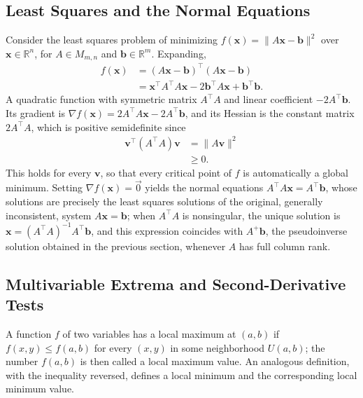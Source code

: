 \subsection{Least Squares and the Normal Equations}

\begin{example}
Consider the least squares problem of minimizing $f(\mathbf{x}) = \|A\mathbf{x} - \mathbf{b}\|^2$ over $\mathbf{x} \in \mathbb{R}^n$, for $A \in M_{m,n}$ and $\mathbf{b} \in \mathbb{R}^m$. Expanding,
\[
\begin{aligned}
f(\mathbf{x}) &= (A\mathbf{x}-\mathbf{b})^{\top}(A\mathbf{x}-\mathbf{b}) \\[0.5em]
&= \mathbf{x}^{\top}A^{\top}A\mathbf{x} - 2\mathbf{b}^{\top}A\mathbf{x} + \mathbf{b}^{\top}\mathbf{b}.
\end{aligned}
\]
A quadratic function with symmetric matrix $A^{\top}A$ and linear coefficient $-2A^{\top}\mathbf{b}$. Its gradient is $\nabla f(\mathbf{x}) = 2A^{\top}A\mathbf{x} - 2A^{\top}\mathbf{b}$, and its Hessian is the constant matrix $2A^{\top}A$, which is positive semidefinite since
\[
\begin{aligned}
\mathbf{v}^{\top}(A^{\top}A)\mathbf{v} &= \|A\mathbf{v}\|^2 \\
&\geq 0.
\end{aligned}
\]
This holds for every $\mathbf{v}$, so that every critical point of $f$ is automatically a global minimum. Setting $\nabla f(\mathbf{x}) = \vec{0}$ yields the normal equations $A^{\top}A\mathbf{x} = A^{\top}\mathbf{b}$, whose solutions are precisely the least squares solutions of the original, generally inconsistent, system $A\mathbf{x} = \mathbf{b}$; when $A^{\top}A$ is nonsingular, the unique solution is $\mathbf{x} = (A^{\top}A)^{-1}A^{\top}\mathbf{b}$, and this expression coincides with $A^{+}\mathbf{b}$, the pseudoinverse solution obtained in the previous section, whenever $A$ has full column rank.
\end{example}

\subsection{Multivariable Extrema and Second-Derivative Tests}

\begin{definition}
A function $f$ of two variables has a local maximum at $(a,b)$ if $f(x,y) \leq f(a,b)$ for every $(x,y)$ in some neighborhood $U(a,b)$; the number $f(a,b)$ is then called a local maximum value. An analogous definition, with the inequality reversed, defines a local minimum and the corresponding local minimum value.
\end{definition}

